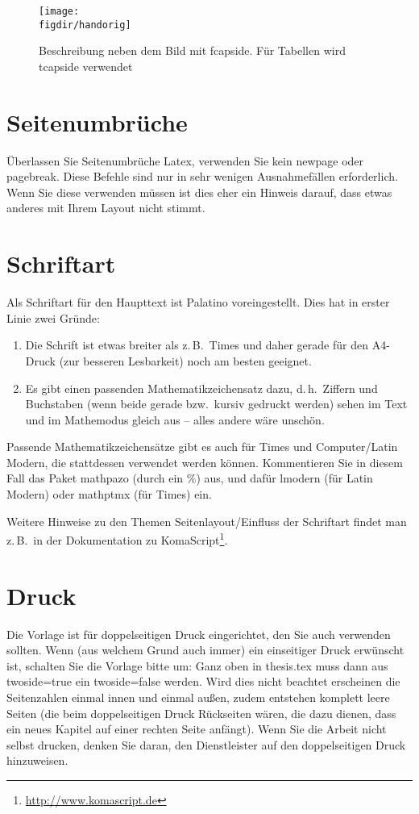 \begin{figure}[t]
\fcapside
{\caption{Beschreibung neben dem Bild mit fcapside. Für Tabellen wird tcapside verwendet}
\label{fig:beschreibung-neben-bild-2}}
{\texttt{[image: \\figdir/handorig]}}
\end{figure}


\section{Seitenumbrüche}
Überlassen Sie Seitenumbrüche Latex, verwenden Sie kein newpage oder pagebreak.
Diese Befehle sind nur in sehr wenigen Ausnahmefällen erforderlich.
Wenn Sie diese verwenden müssen ist dies eher ein Hinweis darauf, dass etwas anderes mit Ihrem Layout nicht stimmt.

\section{Schriftart}
Als Schriftart für den Haupttext ist Palatino voreingestellt.
Dies hat in erster Linie zwei Gründe:
\begin{enumerate}
\item
Die Schrift ist etwas breiter als z.\,B.\ Times und daher gerade für den A4-Druck (zur besseren Lesbarkeit) noch am besten geeignet.
\item
Es gibt einen passenden Mathematikzeichensatz dazu, d.\,h.\ Ziffern und Buchstaben (wenn beide gerade bzw.\ kursiv gedruckt werden) sehen im Text und im Mathemodus gleich aus -- alles andere wäre unschön.
\end{enumerate}
Passende Mathematikzeichensätze gibt es auch für Times und Computer/Latin Modern, die stattdessen verwendet werden können.
Kommentieren Sie in diesem Fall das Paket mathpazo (durch ein \%) aus, und dafür lmodern (für Latin Modern) oder mathptmx (für Times) ein.

Weitere Hinweise zu den Themen Seitenlayout/Einfluss der Schriftart findet man z.\,B.\ in der Dokumentation zu KomaScript\footnote{\url{http://www.komascript.de}}.


\section{Druck}
Die Vorlage ist für doppelseitigen Druck eingerichtet, den Sie auch verwenden sollten.
Wenn (aus welchem Grund auch immer) ein einseitiger Druck erwünscht ist, schalten Sie die Vorlage bitte um: Ganz oben in thesis.tex muss dann aus twoside=true ein twoside=false werden.
Wird dies  nicht beachtet erscheinen die Seitenzahlen einmal innen und einmal außen, zudem entstehen komplett leere Seiten (die beim doppelseitigen Druck Rückseiten wären, die dazu dienen, dass ein neues Kapitel auf einer rechten Seite anfängt).
Wenn Sie die Arbeit nicht selbst drucken, denken Sie daran, den Dienstleister auf den doppelseitigen Druck hinzuweisen.



